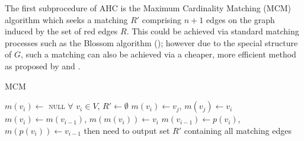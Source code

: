 \documentclass[authoryear]{elsarticle}
\begin{document}
The first subprocedure of AHC is the Maximum Cardinality Matching (MCM) algorithm which seeks a matching $R'$ comprising $n+1$ edges on the graph induced by the set of red edges $R$. This could be achieved via standard matching processes such as the Blossom algorithm (\cite{edmonds1965}); however due to the special structure of $G$, such a matching can also be achieved via a cheaper, more efficient method as proposed by \cite{mahadev1994} and \cite{becker2015}. 

\begin{algorithm}
\caption{\textsc{MCM}}
\begin{algorithmic}[1]
	\State $m(v_i) \gets$ \textsc{null} $\forall$ $v_i \in V$, $R' \gets \emptyset$
				\State $m(v_i) \gets v_j$, $m(v_j) \gets v_i$
				\Break
			\EndIf
		\EndFor
			\State $m(v_i) \gets m(v_{i-1})$, $m(m(v_i)) \gets v_i$
			\State $m(v_{i-1}) \gets p(v_i)$, $m(p(v_i)) \gets v_{i-1}$
		\EndIf
	\EndFor
	\State then need to output set $R'$ containing all matching edges
\end{algorithmic}
\label{alg:mcm}	
\end{algorithm}

\begin{comment}
\begin{algorithm}
\caption{\textsc{MCM}}
\begin{algorithmic}[1]
	\State $R' \gets \emptyset$, $V_{\textup{used}} \gets \emptyset$
	\For{$i \gets 1$ \To $2n+2$ : $v_i \notin V_{\textup{used}}$}
		\For{$j \gets 2n+2$ \To 1 : $v_j \notin V_{\textup{used}}$}
			\If{$\{v_i, v_j\} \in R$}
				\State $V_{\textup{used}} \gets V_{\textup{used}} \cup \{v_i, v_j\}$
				\State $R' \gets R' \cup \{\{v_i, v_j\}\}$
				\Break
			\EndIf
		\EndFor
	\EndFor
\end{algorithmic}
\label{alg:mcmvused}	
\end{algorithm}	
\end{comment}
\end{document}
